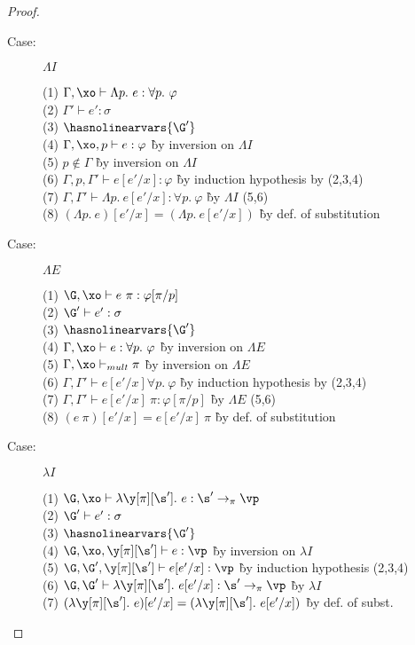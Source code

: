 \begin{proof}
\begin{description}
\item[Case:] $\Lambda I$
\begin{tabbing}
  (1) $\Gamma, \xo \vdash \Lambda p.~e : \forall p.~\varphi$\\
  (2) $\Gamma' \vdash e' : \sigma$ \\
  (3) $\hasnolinearvars{\G'}$\\
  (4) $\Gamma, \xo, p \vdash e : \varphi$ \` by inversion on $\Lambda I$\\
  (5) $p \notin \Gamma$ \` by inversion on $\Lambda I$\\
  (6) $\Gamma, p, \Gamma' \vdash e[e'/x] : \varphi$ \` by induction hypothesis by (2,3,4)\\
  (7) $\Gamma, \Gamma' \vdash \Lambda p.~e[e'/x] : \forall p.~\varphi$ \` by $\Lambda I$ (5,6)\\
  (8) $(\Lambda p.~e)[e'/x] = (\Lambda p.~e[e'/x])$ \` by def. of substitution\\
\end{tabbing}

\item[Case:] $\Lambda E$
\begin{tabbing}
  (1) $\G, \xo \vdash e~\pi: \varphi[\pi/p]$\\
  (2) $\G' \vdash e' : \sigma$\\
  (3) $\hasnolinearvars{\G'}$\\
  (4) $\Gamma, \xo \vdash e : \forall p.~\varphi$ \` by inversion on $\Lambda E$\\
  (5) $\Gamma, \xo \vdash_{mult} \pi$ \` by inversion on $\Lambda E$\\
  (6) $\Gamma, \Gamma' \vdash e[e'/x] \forall p.~\varphi$ \` by induction hypothesis by (2,3,4)\\
  (7) $\Gamma, \Gamma' \vdash e[e'/x]~\pi : \varphi[\pi/p]$ \` by $\Lambda E$ (5,6)\\
  (8) $(e~\pi)[e'/x] = e[e'/x]~\pi$ \` by def. of substitution\\
\end{tabbing}

\item[Case:] $\lambda I$
\begin{tabbing}
  (1) $\G, \xo \vdash \lambda\y[\pi][\s'].~e : \s'\to_\pi\vp$\\
  (2) $\G' \vdash e' : \sigma$\\
  (3) $\hasnolinearvars{\G'}$\\
  (4) $\G, \xo, \y[\pi][\s'] \vdash e : \vp$ \` by inversion on $\lambda I$\\
  (5) $\G, \G', \y[\pi][\s'] \vdash e[e'/x] : \vp$ \` by induction hypothesis (2,3,4)\\
  (6) $\G, \G' \vdash \lambda\y[\pi][\s'].~e[e'/x] : \s' \to_\pi\vp$ \` by $\lambda I$\\
  (7) $(\lambda \y[\pi][\s'].~e)[e'/x] = (\lambda \y[\pi][\s'].~e[e'/x])$ \` by def. of subst.\\
\end{tabbing}


\end{description}
\end{proof}
